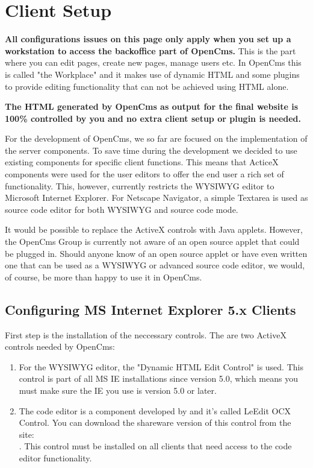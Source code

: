 \section{Client Setup}

\textbf{All configurations issues on this page only apply when you
set up a workstation to access the backoffice part of OpenCms.}
This is the part where you can edit pages, create new pages,
manage users etc. In OpenCms this is called "the Workplace" and it
makes use of dynamic HTML and some plugins to provide editing
functionality that can not be achieved using HTML alone.

\textbf{The HTML generated by OpenCms as output for the final
website is 100\% controlled by you and no extra client setup or
plugin is needed.}

For the development of OpenCms, we so far are focused on the
implementation of the server components. To save time during the
development we decided to use existing components for specific
client functions. This means that ActiceX components were used for
the user editors to offer the end user a rich set of
functionality. This, however, currently restricts the WYSIWYG
editor to Microsoft Internet Explorer. For Netscape Navigator, a
simple Textarea is used as source code editor for both WYSIWYG and
source code mode.

It would be possible to replace the ActiveX controls with Java
applets. However, the OpenCms Group is currently not aware of an
open source applet that could be plugged in. Should anyone know of
an open source applet or have even written one that can be used as
a WYSIWYG or advanced source code editor, we would, of course, be
more than happy to use it in OpenCms.


\subsection{Configuring MS Internet Explorer 5.x Clients}

First step is the installation of the neccessary controls. The are
two ActiveX controls needed by OpenCms:

\begin{enumerate}
\item For the WYSIWYG editor, the "Dynamic HTML Edit Control" is
used. This control is part of all MS IE installations since
version 5.0, which means you must make sure the IE you use is
version 5.0 or later.
\item The code editor is a component developed by 
	 and it's
called LeEdit OCX Control. You can download the shareware version
of this control from the site:\\
.
This control must be installed on all clients that need access to
the code editor functionality.
\end{enumerate}

